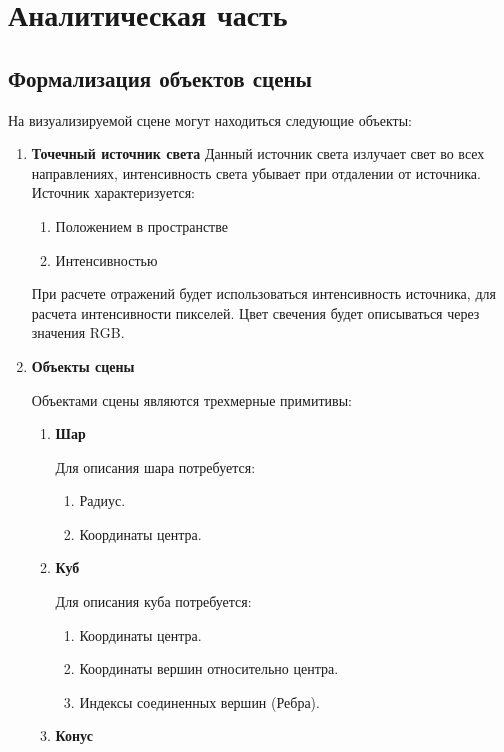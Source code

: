 
\chapter{Аналитическая часть}
\section[Формализация объектов синтезируемой сцены]{Формализация объектов сцены}
\label{sec:obj_formalasation}
На визуализируемой сцене могут находиться следующие объекты:
\begin{enumerate}
	\item \textbf{Точечный источник света}
	Данный источник света излучает свет во всех направлениях, интенсивность света убывает при отдалении от источника.
	Источник характеризуется:
	\begin{enumerate}[label*=\arabic*.]
		\item Положением в пространстве
		\item Интенсивностью
	\end{enumerate}
	При расчете отражений будет использоваться интенсивность источника, для расчета интенсивности пикселей. Цвет свечения будет описываться через значения RGB.
	\item \textbf{Объекты сцены}
	
	Объектами сцены являются трехмерные примитивы:
	\begin{enumerate}[label*=\arabic*.]
		\item \textbf{Шар}
		
		Для описания шара потребуется:
		\begin{enumerate}[label*=\arabic*.]
			\item Радиус.
			\item Координаты центра.
		\end{enumerate}
		\item  \textbf{Куб}
		
		Для описания куба потребуется:
		\begin{enumerate}[label*=\arabic*.]
			\item Координаты центра.
			\item Координаты вершин относительно центра.
			\item Индексы соединенных вершин (Ребра).
		\end{enumerate}
		\item  \textbf{Конус}
		

\end{enumerate}
\end{enumerate}
